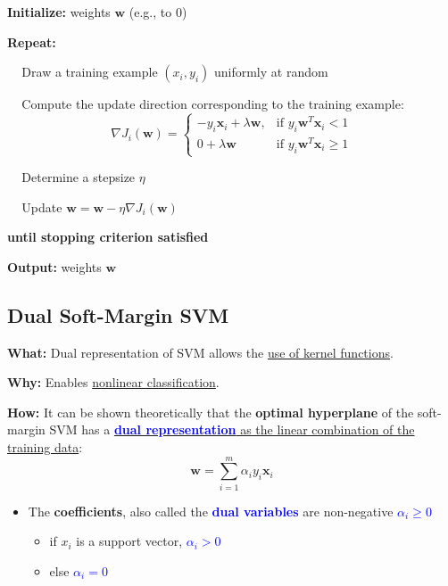 \documentclass[12pt, a4paper]{article}
\begin{document}
\begin{tcolorbox}[title={Stochastic gradient descent algorithm for soft-margin SVM}]

  \textbf{Initialize:} weights $\mathbf{w}$ (e.g., to $0$)

  \textbf{Repeat:}
  \begin{description}
    \item $\;\;\;$ Draw a training example $(x_i, y_i)$ uniformly at random
    \item $\;\;\;$ Compute the update direction corresponding to the training example:
    $$
    \nabla J_i (\mathbf{w}) =
    \begin{cases}
    - y_i \mathbf{x}_i + \lambda \mathbf{w},     & \text{if } y_i \mathbf{w}^T \mathbf{x}_i < 1 \\
    0 + \lambda \mathbf{w} & \text{if } y_i \mathbf{w}^T \mathbf{x}_i \geq 1
    \end{cases}
    $$
    \item $\;\;\;$ Determine a stepsize $\eta$
    \item $\;\;\;$ Update $\mathbf{w} = \mathbf{w} - \eta \nabla J_i(\mathbf{w})$
  \end{description}
  \textbf{until stopping criterion satisfied}

  \textbf{Output:} weights $\mathbf{w}$
\end{tcolorbox}








\subsection{Dual Soft-Margin SVM}\label{dual-soft-margin-svm}

\textbf{What:} Dual representation of SVM allows the \uline{use of kernel functions}.

\textbf{Why:} Enables \uline{nonlinear classification}.

\textbf{How:} It can be shown theoretically that the \textbf{optimal hyperplane} of the soft-margin SVM has a \uline{\textbf{\textcolor{blue}{dual representation}} as the linear combination of the training data}:
$$
\mathbf{w} = \sum_{i=1}^m \alpha_i y_i \mathbf{x}_i
$$

\begin{itemize}
  \item The \textbf{coefficients}, also called the \textbf{\textcolor{blue}{dual variables}} are non-negative \textcolor{blue}{$\alpha_i \geq 0$}
  \begin{itemize}
    \item if $x_i$ is a support vector, \textcolor{blue}{$\alpha_i > 0$}
    \item else \textcolor{blue}{$\alpha_i = 0$}
  \end{itemize}
\end{itemize}
\end{document}
